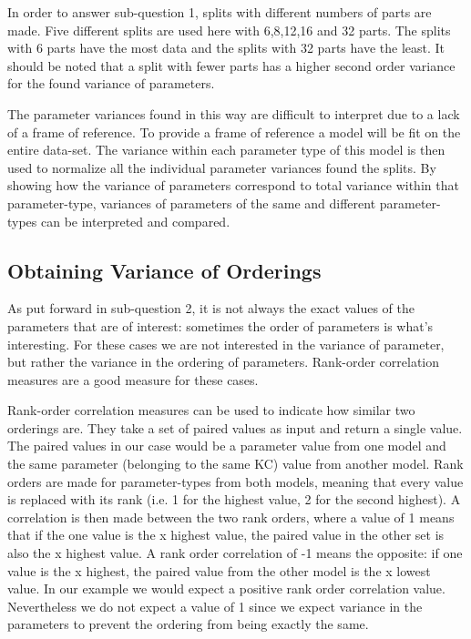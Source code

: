 \documentclass{scrartcl}
\begin{document}
In order to answer sub-question 1, splits with different numbers of parts are made. Five different splits are used here with 6,8,12,16 and 32 parts. The splits with 6 parts have the most data and the splits with 32 parts have the least. It should be noted that a split with fewer parts has a higher second order variance for the found variance of parameters.

The parameter variances found in this way are difficult to interpret due to a lack of a frame of reference. To provide a frame of reference a model will be fit on the entire data-set. The variance within each parameter type of this model is then used to normalize all the individual parameter variances found the splits. By showing how the variance of parameters correspond to total variance within that parameter-type, variances of parameters of the same and different parameter-types can be interpreted and compared.


\subsection{Obtaining Variance of Orderings}
As put forward in sub-question 2, it is not always the exact values of the parameters that are of interest: sometimes the order of parameters is what's interesting. For these cases we are not interested in the variance of parameter, but rather the variance in the ordering of parameters. Rank-order correlation measures are a good measure for these cases.

Rank-order correlation measures can be used to indicate how similar two orderings are. They take a set of paired values as input and return a single value. The paired values in our case would be a parameter value from one model and the same parameter (belonging to the same KC) value from another model. Rank orders are made for parameter-types from both models, meaning that every value is replaced with its rank (i.e. 1 for the highest value, 2 for the second highest). A correlation is then made between the two rank orders, where a value of 1 means that if the one value is the x highest value, the paired value in the other set is also the x highest value. A rank order correlation of -1 means the opposite: if one value is the x highest, the paired value from the other model is the x lowest value. In our example we would expect a positive rank order correlation value. Nevertheless we do not expect a value of 1 since we expect variance in the parameters to prevent the ordering from being exactly the same. 
\end{document}
